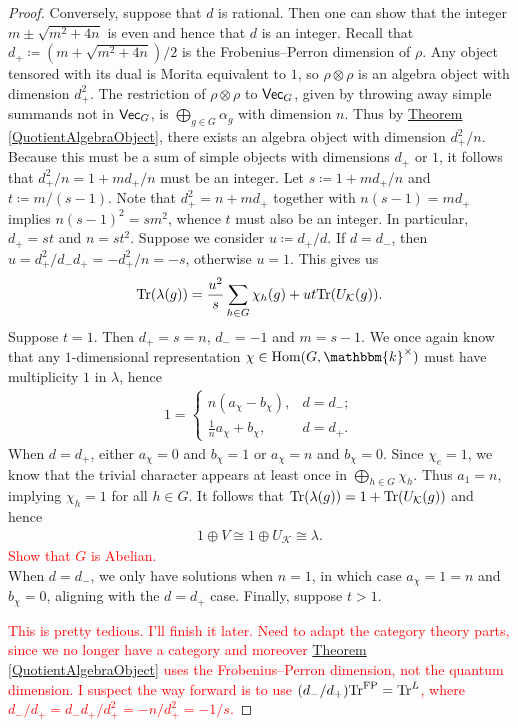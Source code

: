 \begin{proof}
\noindent Conversely, suppose that ${d}$ is rational. Then one can show that the integer $m \pm \sqrt{m^2 + 4n}$ is even and hence that ${d}$ is an integer. Recall that $d_+ \coloneqq (m + \sqrt{m^2 + 4n})/2$ is the Frobenius--Perron dimension of $\rho$. Any object tensored with its dual is Morita equivalent to $1$, so $\rho \otimes \rho$ is an algebra object with dimension $d_+^2$. The restriction of $\rho \otimes \rho$ to $\textup{\textsf{Vec}}_G$, given by throwing away simple summands not in $\textup{\textsf{Vec}}_G$, is $\bigoplus_{g \in G} \alpha_g$ with dimension $n$. Thus by \hyperref[QuotientAlgebraObject]{Theorem \ref*{QuotientAlgebraObject}}, there exists an algebra object with dimension $d_+^2/n$. Because this must be a sum of simple objects with dimensions $d_+$ or $1$, it follows that $d_+^2/n = 1 + md_+/n$ must be an integer. Let $s \coloneqq 1 + md_+/n$ and $t \coloneqq m/(s - 1)$. Note that $d_+^2 = n + md_+$ together with $n(s - 1) = md_+$ implies $n(s - 1)^2 = sm^2$, whence $t$ must also be an integer. In particular, $d_+ = st$ and $n = st^2$. Suppose we consider $u \coloneqq d_+/d$. If $d = d_-$, then $u = d_+^2/d_-d_+ = -d_+^2/n = -s$, otherwise $u = 1$. This gives us
\begin{align*}
\textup{Tr}(\lambda(g)) = \frac{u^2}{s}\sum_{h \in G} \chi_h(g) + ut\textup{Tr}(U_\mathcal{K}(g)).
\end{align*}
\noindent Suppose $t = 1$. Then $d_+ = s = n$, $d_- = -1$ and $m = s-1$. We once again know that any $1$-dimensional representation $\chi \in \homset(G, \mathbbm{k}^\times)$ must have multiplicity $1$ in $\lambda$, hence
\begin{align*}
1 = \begin{cases}n(a_\chi - b_\chi),&d = d_-;\\\frac{1}{n}a_\chi + b_\chi,&d = d_+.\end{cases}
\end{align*}
\noindent When $d = d_+$, either $a_\chi = 0$ and $b_\chi = 1$ or $a_\chi = n$ and $b_\chi = 0$. Since $\chi_e = 1$, we know that the trivial character appears at least once in  $\bigoplus_{h \in G}\chi_h$. Thus $a_1 = n$, implying $\chi_h = 1$ for all $h \in G$. It follows that $\textup{Tr}(\lambda(g)) = 1 + \textup{Tr}(U_\mathcal{K}(g))$ and hence
\begin{align*}
1 \oplus V \cong 1 \oplus U_\mathcal{K} \cong \lambda.
\end{align*}
\noindent\textcolor{red}{Show that $G$ is Abelian.} \\
\noindent When $d = d_-$, we only have solutions when $n = 1$, in which case $a_\chi = 1 = n$ and $b_\chi = 0$, aligning with the $d = d_+$ case. Finally, suppose $t > 1$.

\textcolor{red}{This is pretty tedious. I'll finish it later. Need to adapt the category theory parts, since we no longer have a category and moreover \hyperref[QuotientAlgebraObject]{Theorem \ref*{QuotientAlgebraObject}} uses the Frobenius--Perron dimension, not the quantum dimension. I suspect the way forward is to use $(d_-/d_+)\textup{Tr}^\textup{FP} = \textup{Tr}^L$, where $d_-/d_+ = d_-d_+/d_+^2 = -n/d_+^2 = -1/s$.}
\end{proof}\\

